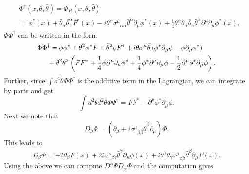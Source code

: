 \documentclass[a4paper,11pt]{article}
\begin{document}
	\begin{equation}
	\begin{split}
		& \Phi^\dagger \left(x,\theta,\bar{\theta}\right)=\Phi_R\left(x,\theta,\bar{\theta}\right) \\
		& =\phi^*\left(x\right)+{\bar{\theta}}_{\dot{\alpha}}{\bar{\theta}}^{\dot{\alpha}}F^*\left(x\right)-i \theta^\alpha {\sigma^\mu}_{\alpha \dot{\alpha}}{\bar{\theta}}^{\dot{\alpha}}\partial_\mu \phi^*\left(x\right)+\frac{1}{4}\theta^\alpha \theta_\alpha {\bar{\theta}}_{\dot{\alpha}}{\bar{\theta}}^{\dot{\alpha}}\partial^\mu \partial_\mu \phi^*\left(x\right).
	\end{split}
	\end{equation}
	$\Phi \Phi^\dagger$ can be written in the form
	\begin{equation}\label{DisplayFormulaNumbered:eq.PhiPhiDg}
	\begin{split}
		& \Phi \Phi^\dagger =\phi \phi^*+\theta^2 \phi^* F+{\bar{\theta}}^2\phi F^* + i \theta \sigma^\mu \bar{\theta} \left(\phi^*\partial_\mu \phi -\phi \partial_\mu \phi^*\right) \\
		& \indent{}+\theta^2{\bar{\theta}}^2 \left(F F^*+\frac{1}{4}\phi \partial^\mu \partial_\mu \phi^*+\frac{1}{4}\phi^*\partial^\mu \partial_\mu \phi -\frac{1}{2}\partial^\mu \phi^*\partial_\mu \phi \right).
	\end{split}
	\end{equation}
	Further, since $\int d^4\theta \Phi \Phi^\dagger$ is the additive term in the Lagrangian, we can integrate by parts and get
	\begin{equation}\label{DisplayFormulaNumbered:eq.PhiPhiDgIntegral}
		\int d^2\theta d^2\bar{\theta} \Phi \Phi^\dagger
		= F F^*-\partial^\mu \phi^*\partial_\mu \phi.
	\end{equation}
	Next we note that
	\begin{equation}
		D_\beta \Phi =\left(\partial_\beta+i {\sigma^\mu}_{\beta \dot{\beta}}{\bar{\theta}}^{\dot{\beta}}\partial_\mu \right) \Phi.
	\end{equation}
	This leads to
	\begin{equation}\label{DisplayFormulaNumbered:eq.DPhi}
		D_\beta \Phi =-2\theta_\beta F\left(x\right)+2i {\sigma^\kappa}_{\beta \dot{\gamma}}{\bar{\theta}}^{\dot{\gamma}}\partial_\kappa \phi \left(x\right)+i \theta^\gamma \theta_\gamma {\sigma^\mu}_{\beta \dot{\beta}}{\bar{\theta}}^{\dot{\beta}}\partial_\mu F\left(x\right).
	\end{equation}
	Using the above we can compute $D^\alpha \Phi D_\alpha \Phi$ and the computation gives
\end{document}
